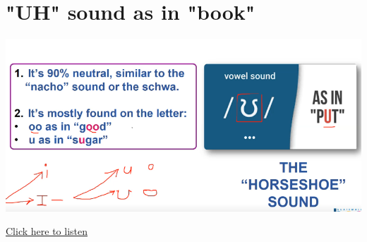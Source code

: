 \section{"UH" sound as in "book" \textipa{/ \textupsilon /}}
\begin{center}
\includegraphics[width=1\textwidth]{images/horseshoe_portrait.png}
\end{center}

\href{https://drive.google.com/file/d/1tOw8dRxqQy4Pn4bsapMfJOim9e4x7oKU/view?usp=sharing}{Click here to listen}

